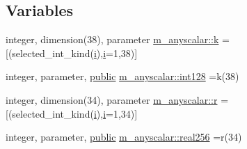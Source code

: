 \subsection*{Variables}
\begin{DoxyCompactItemize}
\item 
integer, dimension(38), parameter \hyperlink{namespacem__anyscalar_a099da1dd8639cdce3d0f5bb3cb8fbd03}{m\+\_\+anyscalar\+::k} =\mbox{[}(selected\+\_\+int\+\_\+kind(\hyperlink{intro__blas1_83_8txt_a8ba82a50c0c2c12d5f6a77f7e4651c0b}{i}),\hyperlink{intro__blas1_83_8txt_a8ba82a50c0c2c12d5f6a77f7e4651c0b}{i}=1,38)\mbox{]}
\item 
integer, parameter, \hyperlink{M__stopwatch_83_8txt_a2f74811300c361e53b430611a7d1769f}{public} \hyperlink{namespacem__anyscalar_a53057899b7d17505b79d9b8f5e6092a2}{m\+\_\+anyscalar\+::int128} =k(38)
\item 
integer, dimension(34), parameter \hyperlink{namespacem__anyscalar_af515907c09cc2ac286a4523cc73f5f52}{m\+\_\+anyscalar\+::r} =\mbox{[}(selected\+\_\+int\+\_\+kind(\hyperlink{intro__blas1_83_8txt_a8ba82a50c0c2c12d5f6a77f7e4651c0b}{i}),\hyperlink{intro__blas1_83_8txt_a8ba82a50c0c2c12d5f6a77f7e4651c0b}{i}=1,34)\mbox{]}
\item 
integer, parameter, \hyperlink{M__stopwatch_83_8txt_a2f74811300c361e53b430611a7d1769f}{public} \hyperlink{namespacem__anyscalar_a6d3ef2bc1698c91d737dbd8824a9eb0b}{m\+\_\+anyscalar\+::real256} =r(34)
\end{DoxyCompactItemize}
